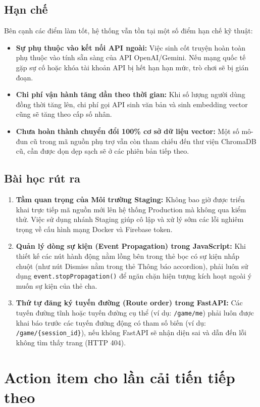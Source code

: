 \documentclass[a4paper]{article}
\begin{document}
\begin{titlepage}
\subsection{Hạn chế}
Bên cạnh các điểm làm tốt, hệ thống vẫn tồn tại một số điểm hạn chế kỹ thuật:
\begin{itemize}
    \item \textbf{Sự phụ thuộc vào kết nối API ngoài:} Việc sinh cốt truyện hoàn toàn phụ thuộc vào tính sẵn sàng của API OpenAI/Gemini. Nếu mạng quốc tế gặp sự cố hoặc khóa tài khoản API bị hết hạn hạn mức, trò chơi sẽ bị gián đoạn.
    \item \textbf{Chi phí vận hành tăng dần theo thời gian:} Khi số lượng người dùng đồng thời tăng lên, chi phí gọi API sinh văn bản và sinh embedding vector cũng sẽ tăng theo cấp số nhân.
    \item \textbf{Chưa hoàn thành chuyển đổi 100\% cơ sở dữ liệu vector:} Một số mô-đun cũ trong mã nguồn phụ trợ vẫn còn tham chiếu đến thư viện ChromaDB cũ, cần được dọn dẹp sạch sẽ ở các phiên bản tiếp theo.
\end{itemize}

\subsection{Bài học rút ra}
\begin{enumerate}
    \item \textbf{Tầm quan trọng của Môi trường Staging:} Không bao giờ được triển khai trực tiếp mã nguồn mới lên hệ thống Production mà không qua kiểm thử. Việc sử dụng nhánh Staging giúp cô lập và xử lý sớm các lỗi nghiêm trọng về cấu hình mạng Docker và Firebase token.
    \item \textbf{Quản lý dòng sự kiện (Event Propagation) trong JavaScript:} Khi thiết kế các nút hành động nằm lồng bên trong thẻ bọc có sự kiện nhấp chuột (như nút Dismiss nằm trong thẻ Thông báo accordion), phải luôn sử dụng \texttt{event.stopPropagation()} để ngăn chặn hiện tượng kích hoạt ngoài ý muốn sự kiện của thẻ cha.
    \item \textbf{Thứ tự đăng ký tuyến đường (Route order) trong FastAPI:} Các tuyến đường tĩnh hoặc tuyến đường cụ thể (ví dụ: \texttt{/game/me}) phải luôn được khai báo trước các tuyến đường động có tham số biến (ví dụ: \texttt{/game/\{session\_id\}}), nếu không FastAPI sẽ nhận diện sai và dẫn đến lỗi không tìm thấy trang (HTTP 404).
\end{enumerate}

\section{Action item cho lần cải tiến tiếp theo}


\end{titlepage}
\end{document}
